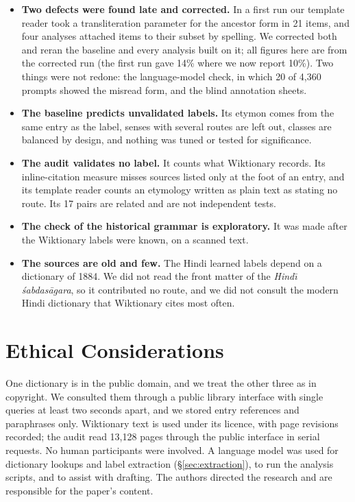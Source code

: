 \documentclass[11pt]{article}
\begin{document}
\begin{itemize}
\item \textbf{Two defects were found late and corrected.} In a first run our template reader took a transliteration parameter for the ancestor form in 21 items, and four analyses attached items to their subset by spelling. We corrected both and reran the baseline and every analysis built on it; all figures here are from the corrected run (the first run gave 14\% where we now report 10\%). Two things were not redone: the language-model check, in which 20 of 4,360 prompts showed the misread form, and the blind annotation sheets.
\item \textbf{The baseline predicts unvalidated labels.} Its etymon comes from the same entry as the label, senses with several routes are left out, classes are balanced by design, and nothing was tuned or tested for significance.
\item \textbf{The audit validates no label.} It counts what Wiktionary records. Its inline-citation measure misses sources listed only at the foot of an entry, and its template reader counts an etymology written as plain text as stating no route. Its 17 pairs are related and are not independent tests.
\item \textbf{The check of the historical grammar is exploratory.} It was made after the Wiktionary labels were known, on a scanned text.
\item \textbf{The sources are old and few.} The Hindi learned labels depend on a dictionary of 1884. We did not read the front matter of the \textit{Hind\=\i{} \'sabdas\=agara}, so it contributed no route, and we did not consult the modern Hindi dictionary that Wiktionary cites most often.
\end{itemize}

\section*{Ethical Considerations}

One dictionary is in the public domain, and we treat the other three as in copyright. We consulted them through a public library interface with single queries at least two seconds apart, and we stored entry references and paraphrases only. Wiktionary text is used under its licence, with page revisions recorded; the audit read 13,128 pages through the public interface in serial requests. No human participants were involved. A language model was used for dictionary lookups and label extraction (\S\ref{sec:extraction}), to run the analysis scripts, and to assist with drafting. The authors directed the research and are responsible for the paper's content.
\end{document}
